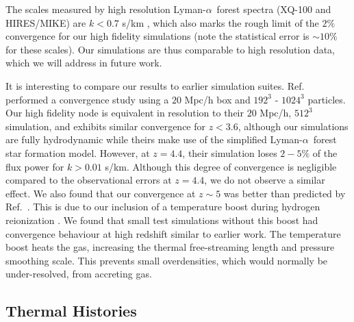 \documentclass[a4paper,11pt]{article}
\newcommand{\spb}[1]{{\textcolor{magenta}{[{\bf SPB}: #1]}}}
\newcommand{\Lya}{Lyman-$\alpha$}
\begin{document}
The scales measured by high resolution \Lya~forest spectra (XQ-100 and HIRES/MIKE) are $ k < 0.7$ s/km \cite{Irsic:2017}, which also marks the rough limit of the $2\%$ convergence for our high fidelity simulations (note the statistical error is $\sim 10\%$ for these scales). Our simulations are thus comparable to high resolution data, which we will address in future work.

It is interesting to compare our results to earlier simulation suites. Ref.~\cite{Borde:2014} performed a convergence study using a $20$ Mpc/h box and $192^3$ - $1024^3$ particles. Our high fidelity node is equivalent in resolution to their $20$ Mpc/h, $512^3$ simulation, and exhibits similar convergence for $z < 3.6$, although our simulations are fully hydrodynamic while theirs make use of the simplified \Lya~forest star formation model. However, at $z=4.4$, their simulation loses $2-5\%$ of the flux power for $k > 0.01$ s/km. Although this degree of convergence is negligible compared to the observational errors at $z=4.4$, we do not observe a similar effect.
We also found that our convergence at $z \sim 5$ was better than predicted by Ref.~\cite{2009MNRAS.398L..26B, Bolton:2017}. This is due to our inclusion of a temperature boost during hydrogen reionization \cite{DAloisio:2019}. We found that small test simulations without this boost had convergence behaviour at high redshift similar to earlier work. The temperature boost heats the gas, increasing the thermal free-streaming length and pressure smoothing scale. This prevents small overdensities, which would normally be under-resolved, from accreting gas.



\subsection{Thermal Histories}
\label{sec:thermal}
\end{document}
